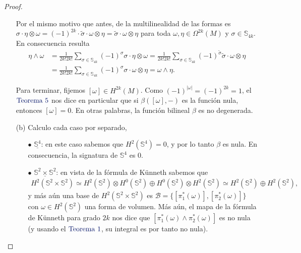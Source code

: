 \documentclass[11pt]{article}
\newcommand{\Ss}{\mathbb{S}}
\newcommand{\paint}[1]{\color{color}{#1}}
\newcommand{\tpaing}[1]{\paint{\text{#1}}}
\begin{document}
\begin{proof}
\begin{itemize}[listparindent = \parindent]
Por el mismo motivo que antes, de la multilinealidad de las formas es $\sigma \cdot \eta \otimes \omega = (-1)^{2k} \cdot \widetilde{\sigma} \cdot \omega \otimes \eta = \widetilde{\sigma} \cdot \omega \otimes \eta$ para toda $\omega, \eta \in \Omega^{2k}(M)$ y $\sigma \in \Ss_{4k}$. En consecuencia resulta
\begin{align*}
\eta \wedge \omega &= \frac{1}{2k!2k!}\sum_{\sigma \in \Ss_{4k}}(-1)^\sigma \sigma \cdot \eta \otimes \omega = \frac{1}{2k!2k!}\sum_{\sigma \in \Ss_{4k}}(-1)^{\widetilde{\sigma}} \widetilde{\sigma}\cdot \omega \otimes \eta\\
&=  \frac{1}{2k!2k!}\sum_{\sigma \in \Ss_{4k}}(-1)^{\sigma} \sigma\cdot \omega \otimes \eta = \omega \wedge \eta.
\end{align*}

Para terminar, fijemos $[\omega] \in H^{2k}(M)$. Como $(-1)^{|\omega|} = (-1)^{2k} = 1$, el $\tpaing{Teorema $5$}$ nos dice en particular que si $\beta([\omega],-)$ es la función nula, entonces $[\omega] = 0$. En otras palabras, la función bilineal $\beta$ es no degenerada. 

\item[(b)] Calculo cada caso por separado,
\begin{itemize}[listparindent = \parindent]
\item[$\bullet$] $\underline{\Ss^4}$: en este caso sabemos que $H^2(\Ss^4) = 0$, y por lo tanto $\beta$ es nula. En consecuencia, la signatura de $\Ss^4$ es $0$.
\item[$\bullet$] $\underline{\Ss^2 \times \Ss^2}$: en vista de la fórmula de Künneth sabemos que
\begin{align*}
H^2(\Ss^2 \times \Ss^2) \simeq H^2(\Ss^2) \otimes H^0(\Ss^2) \oplus H^0(\Ss^2) \otimes H^2(\Ss^2) \simeq H^2(\Ss^2) \oplus H^2(\Ss^2),
\end{align*}
y más aún una base de $H^2(\Ss^2 \times \Ss^2)$ es $\mathscr{B} = \{[\pi_1^*(\omega)],[\pi_2^*(\omega)]\}$ con $\omega \in H^2(\Ss^2)$ una forma de volumen. Más aún, el mapa de la fórmula de Künneth para grado $2k$ nos dice que $[\pi_1^*(\omega) \wedge \pi_2^*(\omega)]$ es no nula (y usando el $\tpaing{Teorema $1$}$, su integral es por tanto no nula). 


\end{itemize}
\end{itemize}
\end{proof}
\end{document}
